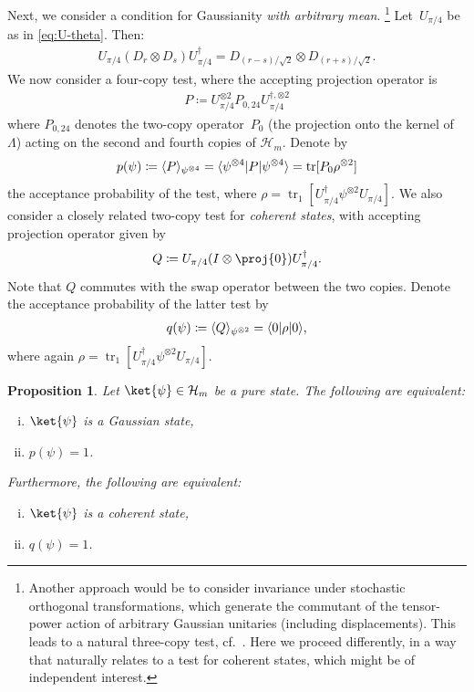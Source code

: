 \documentclass[11pt,a4paper]{article}
\newtheorem{proposition}[theorem]{Proposition}\AddToHook{env/proposition/begin}{\crefalias{theorem}{proposition}}\crefname{proposition}{Proposition}{Propositions}
\numberwithin{equation}{section}
\newcommand{\ot}{\otimes}
\newcommand{\HH}{\mathcal{H}}
\newcommand{\1}{\mathbf{1}}
\DeclareMathOperator{\tr}{tr}
\DeclarePairedDelimiter\angles{\langle}{\rangle}
\DeclarePairedDelimiter\ip{\langle}{\rangle}
\begin{document}
Next, we consider a condition for Gaussianity \emph{with arbitrary mean}.%
\footnote{Another approach would be to consider invariance under stochastic orthogonal transformations, which generate the commutant of the tensor-power action of arbitrary Gaussian unitaries (including displacements).
This leads to a natural three-copy test, cf.~\cite{girardi2025gaussian}.
Here we proceed differently, in a way that naturally relates to a test for coherent states, which might be of independent interest.}
Let~$U_{\pi/4}$ be as in \cref{eq:U-theta}.
Then:
\begin{align}\label{eq:displacement-rotation}
    U_{\pi/4} (D_r \ot D_s) U_{\pi/4}^\dagger = D_{(r - s)/\sqrt2} \ot D_{(r+s)/\sqrt2}.
\end{align}
We now consider a four-copy test, where the accepting projection operator is
\begin{align*}
    P \coloneqq U_{\pi/4}^{\ot 2} P_{0,24} U_{\pi/4}^{\dagger, \ot 2}
\end{align*}
where $P_{0,24}$ denotes the two-copy operator~$P_0$ (the projection onto the kernel of~$\Lambda$) acting on the second and fourth copies of $\HH_m$.
Denote by
\begin{align}\label{eq:four copy prob}
  p(\psi)
\coloneqq \ip{P}_{\psi^{\ot 4}}
= \angles{\psi^{\ot 4} | P | \psi^{\ot 4}}
= \tr[P_0 \rho^{\ot 2}]
\end{align}
the acceptance probability of the test, where $\rho = \tr_1[U_{\pi/4}^\dagger \psi^{\ot 2} U_{\pi/4}]$.
We also consider a closely related two-copy test for \emph{coherent states}, with accepting projection operator given by
\begin{align*}
    Q \coloneqq U_{\pi/4} (I \ot \proj{0}) U_{\pi/4}^\dagger.
\end{align*}
Note that $Q$ commutes with the swap operator between the two copies.
Denote the acceptance probability of the latter test by
\begin{align}\label{eq:coherent prob}
  q(\psi)
\coloneqq \ip{Q}_{\psi^{\ot 2}}
= \ip{0 | \rho | 0},
\end{align}
where again $\rho = \tr_1[U_{\pi/4}^\dagger \psi^{\ot 2} U_{\pi/4}]$.

\begin{proposition}
    Let $\ket{\psi} \in \HH_m$ be a pure state. The following are equivalent:
    \begin{enumerate}[(i),itemsep=0pt]
        \item\label{it:state-gaussian-nonzero-mean} $\ket{\psi}$ is a Gaussian state,
        \item\label{it:p-acc-one-nonzero-mean} $p(\psi) = 1$.
    \end{enumerate}
    Furthermore, the following are equivalent:
    \begin{enumerate}[(i),itemsep=0pt]
        \item\label{it:state-coherent} $\ket{\psi}$ is a coherent state,
        \item\label{it:p-acc-one-coherent} $q(\psi) = 1$.
    \end{enumerate}
\end{proposition}
\end{document}
